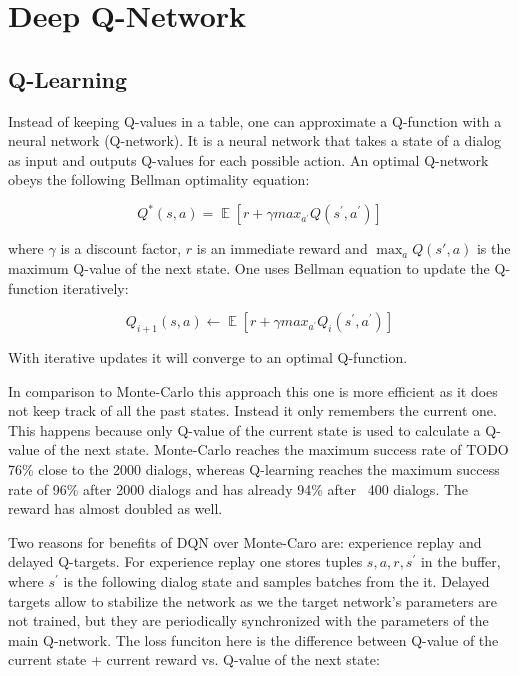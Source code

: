 \documentclass[12pt,titlepage,a4paper]{article}
\DeclareMathOperator*{\E}{\mathbb{E}}
\begin{document}
\pagebreak


\section{Deep Q-Network}

\subsection{Q-Learning}
Instead of keeping Q-values in a table, one can approximate a Q-function with a neural network (Q-network). It is a neural network that takes a state of a dialog as input and outputs Q-values for each possible action. An optimal Q-network obeys the following Bellman optimality equation: 

\[ Q^*(s,a) = \E [r + \gamma max_{a^\prime}Q(s^\prime,a^\prime)] \] 

where $\gamma$ is a discount factor,  $r$ is an immediate reward and $\max_a Q(s',a)$ is the maximum Q-value of the next state. One uses Bellman equation to update the Q-function iteratively:

\[Q_{i + 1} (s,a) \leftarrow \E[r + \gamma max_{a^\prime}Q_{i}(s^\prime,a^\prime)]\]

With iterative updates it will converge to an optimal Q-function.

In comparison to Monte-Carlo this approach this one is more efficient as it does not keep track of all the past states. Instead it only remembers the current one. This happens because only Q-value of the current state is used to calculate a Q-value of the next state. Monte-Carlo reaches the maximum success rate of TODO 76\% close to the 2000 dialogs, whereas Q-learning reaches the maximum success rate of 96\% after 2000 dialogs and has already 94\% after ~400 dialogs. The reward has almost doubled as well. 

Two reasons for benefits of DQN over Monte-Caro are: experience replay and delayed Q-targets. For experience replay one stores tuples ${s, a, r, s^\prime}$ in the buffer, where $s^\prime$ is the following dialog state and samples batches from the it. Delayed targets allow to stabilize the network as we the target network’s parameters are not trained, but they are periodically synchronized with the parameters of the main Q-network. The loss funciton here is the difference between Q-value of the current state + current reward vs. Q-value of the next state:
\end{document}
